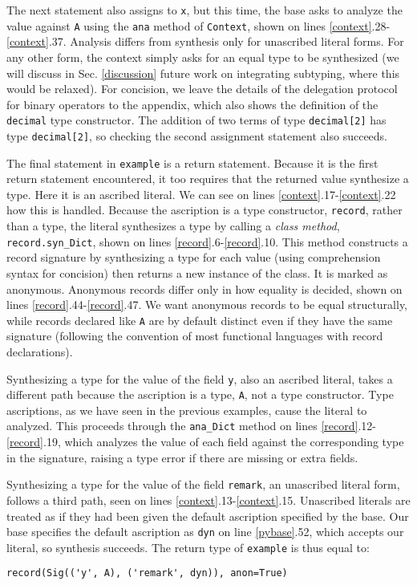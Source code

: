 {The next statement also assigns to \verb|x|, but this time, the base asks to analyze the value against \verb|A| using the \verb|ana| method of \verb|Context|, shown on lines \ref{context}.28-\ref{context}.37. Analysis differs from synthesis only for unascribed literal forms. For any other form, the context simply asks for an equal type to be synthesized (we will discuss in Sec. \ref{discussion} future work on integrating subtyping, where this would be relaxed). For concision, we leave the details of the delegation protocol for binary operators to the appendix, which also shows the definition of the \verb|decimal| type constructor. The addition of two terms of type \verb|decimal[2]| has type \verb|decimal[2]|, so checking the second assignment statement also succeeds.

The final statement in \verb|example| is a return statement. Because it is the first return statement encountered, it too requires that the returned value synthesize a type. Here it is an ascribed literal. We can see on lines \ref{context}.17-\ref{context}.22 how this is handled. Because the ascription is a type constructor, \verb|record|, rather than a type, the literal synthesizes a type by calling a \emph{class method}, \verb|record.syn_Dict|, shown on lines \ref{record}.6-\ref{record}.10. This method constructs a record signature by synthesizing a type for each value (using comprehension syntax for concision) then returns a new instance of the class. It is marked as anonymous. Anonymous records differ only in how equality is decided, shown on lines \ref{record}.44-\ref{record}.47. We want anonymous records to be equal structurally, while records declared like \verb|A| are by default distinct even if they have the same signature (following the convention of most functional languages with record declarations). 

Synthesizing a type for the value of the field \verb|y|, also an ascribed literal, takes a different path because the ascription is a type, \verb|A|, not a type constructor. Type ascriptions, as we have seen in the previous examples, cause the literal to analyzed. This proceeds through the \verb|ana_Dict| method on lines \ref{record}.12-\ref{record}.19, which analyzes the value of each field against the corresponding type in the signature, raising a type error if there are missing or extra fields. %

Synthesizing a type for the value of the field \verb|remark|, an unascribed literal form, follows a third path, seen on lines \ref{context}.13-\ref{context}.15. Unascribed literals are treated as if they had been  given the default ascription specified by the base. Our base specifies the default ascription as \verb|dyn| on line \ref{pybase}.52, which accepts our  literal, so synthesis succeeds. The return type of \verb|example| is thus equal to:
\begin{lstlisting}[numbers=none]
record(Sig(('y', A), ('remark', dyn)), anon=True)
\end{lstlisting}
\vspace{-10px}
}
